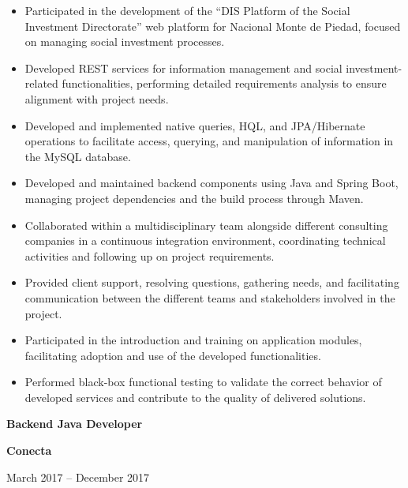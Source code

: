 \documentclass[10pt,letterpaper]{article}
\newcommand{\jobtitle}[1]{
    {\bfseries #1}
}
\newcommand{\company}[1]{
    {\bfseries\color{DarkGray} #1}
}
\newcommand{\jobdate}[1]{
    {\color{MediumGray} #1}
}
\begin{document}
\begin{itemize}

    \item Participated in the development of the ``DIS Platform of the Social Investment Directorate'' web platform for Nacional Monte de Piedad, focused on managing social investment processes.

    \item Developed REST services for information management and social investment-related functionalities, performing detailed requirements analysis to ensure alignment with project needs.

    \item Developed and implemented native queries, HQL, and JPA/Hibernate operations to facilitate access, querying, and manipulation of information in the MySQL database.

    \item Developed and maintained backend components using Java and Spring Boot, managing project dependencies and the build process through Maven.

    \item Collaborated within a multidisciplinary team alongside different consulting companies in a continuous integration environment, coordinating technical activities and following up on project requirements.

    \item Provided client support, resolving questions, gathering needs, and facilitating communication between the different teams and stakeholders involved in the project.

    \item Participated in the introduction and training on application modules, facilitating adoption and use of the developed functionalities.

    \item Performed black-box functional testing to validate the correct behavior of developed services and contribute to the quality of delivered solutions.

\end{itemize}


\jobtitle{Backend Java Developer} \textbar{}
\company{Conecta}
\hfill \textbar{}
\jobdate{March 2017 -- December 2017}
\end{document}
